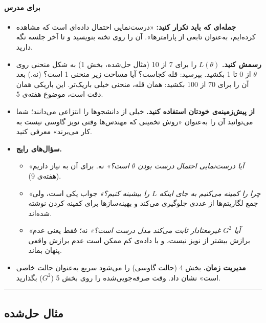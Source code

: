 \paragraph{برای مدرس}

\begin{itemize}
\tightlist
\item
  \textbf{جمله‌ای که باید تکرار کنید:} «درست‌نمایی احتمال داده‌ای است که
  مشاهده کرده‌ایم، به‌عنوان تابعی از پارامترها». آن را روی تخته بنویسید و
  تا آخر جلسه نگه دارید.
\item
  \textbf{رسمش کنید.} \(L(\theta)\) را برای 7 از 10 (مثال حل‌شده، بخش 1)
  به شکل منحنی روی \(\theta\) از 0 تا 1 بکشید. بپرسید: قله کجاست؟ آیا
  مساحت زیر منحنی 1 است؟ (نه.) بعد آن را برای 70 از 100 بکشید: همان قله،
  منحنی خیلی باریک‌تر. این باریکی همان دقت  است، موضوع
  هفته‌ی 5.
\item
  \textbf{از پیش‌زمینه‌ی خودتان استفاده کنید.} خیلی از دانشجوها 
  را انتزاعی می‌دانند؛ شما می‌توانید آن را به‌عنوان «روش تخمینی که مهندس‌ها
  وقتی نویز گاوسی نیست به کار می‌برند» معرفی کنید.
\item
  \textbf{سؤال‌های رایج.}

  \begin{itemize}
  \tightlist
  \item
    \emph{«آیا درست‌نمایی احتمال درست بودن \(\theta\) است؟»} نه. برای آن
    به  نیاز داریم (هفته‌ی 9).
  \item
    \emph{«چرا  را کمینه می‌کنیم به جای اینکه \(L\) را بیشینه
    کنیم؟»} جواب یکی است، ولی جمع لگاریتم‌ها از  عددی
    جلوگیری می‌کند و بهینه‌سازها برای کمینه کردن نوشته شده‌اند.
  \item
    \emph{«آیا \(G^2\) غیرمعنادار ثابت می‌کند مدل درست است؟»} نه؛ فقط
    یعنی عدم برازش بیشتر از نویز نیست، و با داده‌ی کم ممکن است عدم برازش
    واقعی پنهان بماند.
  \end{itemize}
\item
  \textbf{مدیریت زمان.} بخش 4 (حالت گاوسی) را می‌شود سریع به‌عنوان
   حالت خاصی است» نشان داد. وقت صرفه‌جویی‌شده را روی بخش 5
  (\(G^2\)) بگذارید.
\end{itemize}

\begin{center}\rule{0.5\linewidth}{0.5pt}\end{center}


\subsection{مثال حل‌شده}

